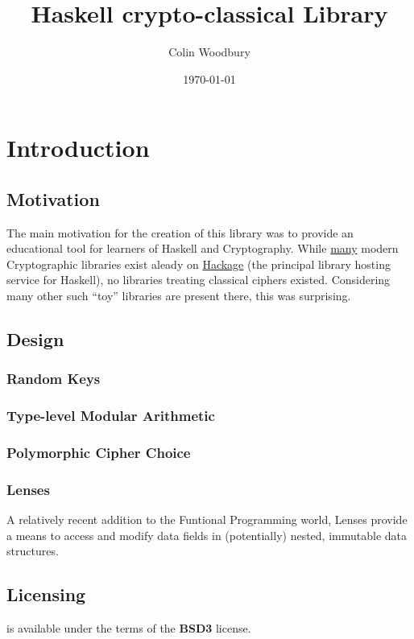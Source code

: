 \documentclass{article}
\begin{document}
\title{Haskell crypto-classical Library}
\author{Colin Woodbury}
\date{\today}
\maketitle

\tableofcontents
\clearpage

\section{Introduction}
\subsection{Motivation}
The main motivation for the creation of this library was to provide
an educational tool for learners of Haskell and Cryptography. While
\href{http://hackage.haskell.org/packages/search?terms=crypto}{many}
modern Cryptographic libraries exist aleady on
\href{http://hackage.haskell.org}{Hackage} (the principal
library hosting service for Haskell), no libraries treating classical
ciphers existed. Considering many other such ``toy'' libraries are
present there, this was surprising.

\subsection{Design}

\subsubsection{Random Keys}
\subsubsection{Type-level Modular Arithmetic}
\subsubsection{Polymorphic Cipher Choice}
\subsubsection{Lenses}
A relatively recent addition to the Funtional Programming world, Lenses
provide a means to access and modify data fields in (potentially) nested,
immutable data structures.

\subsection{Licensing}
 is available under the terms of the \textbf{BSD3}
license.
\end{document}
